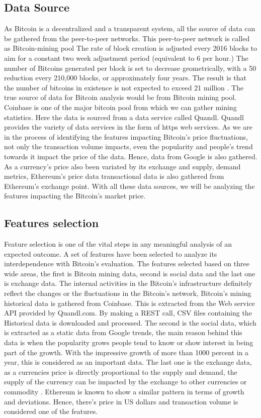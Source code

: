 \documentclass[sigconf]{acmart}
\begin{document}
 
 \subsection{Data Source}
 As Bitcoin is a decentralized and a transparent system, all the source of data can be gathered from the peer-to-peer networks. This peer-to-peer network is called as Bitcoin-mining pool \cite{1:online}
 The rate of block creation is adjusted every 2016 blocks to aim for a constant two week adjustment period (equivalent to 6 per hour.) The number of Bitcoins generated per block is set to decrease geometrically, with a 50 reduction every 210,000 blocks, or approximately four years. The result is that the number of bitcoins in existence is not expected to exceed 21 million \cite{2:online}.
        The true source of data for Bitcoin analysis would be from Bitcoin mining pool. Coinbase is one of the 
major bitcoin pool from which we can gather mining statistics. Here the data is sourced from a data service called Quandl. Quandl provides the variety of data services in the form of https web services. As we are in the process of identifying the features impacting Bitcoin's price fluctuations, not only the transaction volume impacts, even the popularity and people's trend towards it impact the price of the data. Hence, data from Google is also gathered. As a currency's price also been variated by its exchange and supply, demand metrics, Ethereum's price data transactional data is also gathered from Ethereum's exchange point.
With all these data sources, we will be analyzing the features impacting the Bitcoin's market price. 
 

 
 \subsection{Features selection}
 Feature selection is one of the vital steps in any meaningful analysis of an expected outcome. A set of features have been selected to analyze its interdependence with Bitcoin's evaluation. The features selected based on three wide areas, the first is Bitcoin mining data, second is social data and the last one is exchange data.
 The internal activities in the Bitcoin's infrastructure definitely reflect the changes or the fluctuations in the Bitcoin's network, Bitcoin's mining historical data is gathered from Coinbase. This is extracted from the Web service API provided by Quandl.com. By making a REST call, CSV files containing the Historical data is downloaded and processed.
 The second is the social data, which is extracted as a static data from Google trends, the main reason behind this data is when the popularity grows people tend to know or show interest in being part of the growth. With the impressive growth of more than 1000 percent in a year, this is considered as an important data.
 The last one is the exchange data, as a currencies price is directly proportional to the supply and demand, the supply of the currency can be impacted by the exchange to other currencies or commodity \cite{4:online}. Ethereum is known to show a similar pattern in terms of growth and deviations. Hence, there's price in US dollars and transaction volume is considered one of the features.
\end{document}
